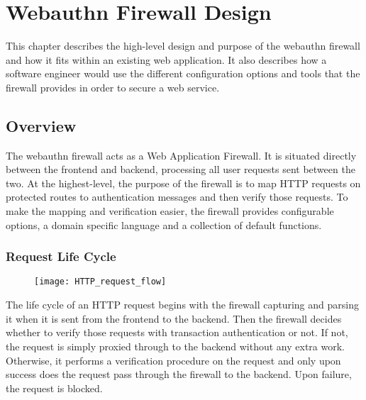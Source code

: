 \chapter{Webauthn Firewall Design}\label{Chap:WebauthnFirewallDesign}

This chapter describes the high-level design and purpose of the webauthn firewall and how it fits within an existing web application. It also describes how a software engineer would use the different configuration options and tools that the firewall provides in order to secure a web service.

\section{Overview}

The webauthn firewall acts as a Web Application Firewall. It is situated directly between the frontend and backend, processing all user requests sent between the two. At the highest-level, the purpose of the firewall is to map HTTP requests on protected routes to authentication messages and then verify those requests. To make the mapping and verification easier, the firewall provides configurable options, a domain specific language and a collection of default functions.

\subsection{Request Life Cycle}

\begin{figure}[h]
  \centering
  \texttt{[image: HTTP\_request\_flow]}
\end{figure}

The life cycle of an HTTP request begins with the firewall capturing and parsing it when it is sent from the frontend to the backend. Then the firewall decides whether to verify those requests with transaction authentication or not. If not, the request is simply proxied through to the backend without any extra work. Otherwise, it performs a verification procedure on the request and only upon success does the request pass through the firewall to the backend. Upon failure, the request is blocked.

